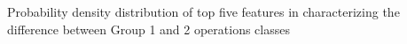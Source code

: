 Probability density distribution of top five features in characterizing the difference between Group 1 and 2 operations classes
\label{fig:topfivefeatures_operationsclass}